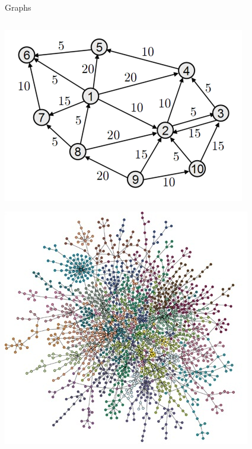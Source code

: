 \begin{frame}{Graphs}
	\begin{columns}
		\pause
		\begin{column}{0.3\textwidth}
			\includegraphics[width=\textwidth]{graph1}
			\par
			\vspace{2ex}
			\includegraphics[width=\textwidth]{graph2}
		\end{column}
		\begin{column}{0.68\textwidth}
			\begin{itemize}

\end{itemize}
\end{column}
\end{columns}
\end{frame}
